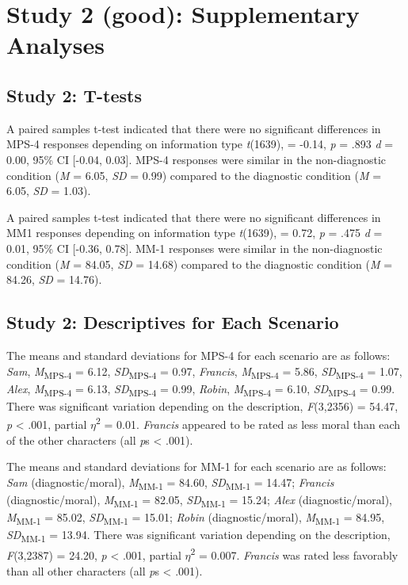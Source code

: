 \documentclass[
  man,floatsintext]{apa6}
\begin{document}
\pagebreak

\section{Study 2 (good): Supplementary Analyses}\label{study-2-good-supplementary-analyses}

\subsection{Study 2: T-tests}\label{study-2-t-tests}

A paired samples t-test indicated that there were no significant differences in MPS-4 responses depending on information type
\emph{t}(1639),
= -0.14,
\emph{p} = .893
\emph{d} = 0.00,
95\% CI {[}-0.04, 0.03{]}.
MPS-4 responses were similar in the non-diagnostic condition
(\emph{M} = 6.05,
\emph{SD} = 0.99)
compared to the diagnostic condition
(\emph{M} = 6.05,
\emph{SD} = 1.03).

A paired samples t-test indicated that there were no significant differences in MM1 responses depending on information type
\emph{t}(1639),
= 0.72,
\emph{p} = .475
\emph{d} = 0.01,
95\% CI {[}-0.36, 0.78{]}.
MM-1 responses were similar in the non-diagnostic condition
(\emph{M} = 84.05,
\emph{SD} = 14.68)
compared to the diagnostic condition
(\emph{M} = 84.26,
\emph{SD} = 14.76).

\subsection{Study 2: Descriptives for Each Scenario}\label{study-2-descriptives-for-each-scenario}

The means and standard deviations for MPS-4 for each scenario are as follows:
\emph{Sam},
\emph{M}\textsubscript{MPS-4} = 6.12, \emph{SD}\textsubscript{MPS-4} = 0.97,
\emph{Francis},
\emph{M}\textsubscript{MPS-4} = 5.86, \emph{SD}\textsubscript{MPS-4} = 1.07,
\emph{Alex},
\emph{M}\textsubscript{MPS-4} = 6.13, \emph{SD}\textsubscript{MPS-4} = 0.99,
\emph{Robin},
\emph{M}\textsubscript{MPS-4} = 6.10, \emph{SD}\textsubscript{MPS-4} = 0.99. There was significant variation depending on the description, \emph{F}(3,2356) = 54.47, \emph{p} \textless{} .001, partial \(\eta\)\textsuperscript{2} = 0.01. \emph{Francis} appeared to be rated as less moral than each of the other characters (all \emph{p}s \textless{} .001).

The means and standard deviations for MM-1 for each scenario are as follows:
\emph{Sam} (diagnostic/moral),
\emph{M}\textsubscript{MM-1} = 84.60, \emph{SD}\textsubscript{MM-1} = 14.47;
\emph{Francis} (diagnostic/moral),
\emph{M}\textsubscript{MM-1} = 82.05, \emph{SD}\textsubscript{MM-1} = 15.24;
\emph{Alex} (diagnostic/moral),
\emph{M}\textsubscript{MM-1} = 85.02, \emph{SD}\textsubscript{MM-1} = 15.01;
\emph{Robin} (diagnostic/moral),
\emph{M}\textsubscript{MM-1} = 84.95, \emph{SD}\textsubscript{MM-1} = 13.94. There was significant variation depending on the description, \emph{F}(3,2387) = 24.20, \emph{p} \textless{} .001, partial \(\eta\)\textsuperscript{2} = 0.007. \emph{Francis} was rated less favorably than all other characters (all \emph{p}s \textless{} .001).
\end{document}
